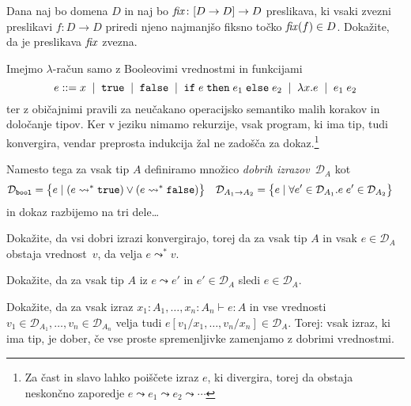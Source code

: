 \documentclass[arhiv]{izpit}
\begin{document}
\nadaljevanje

\naloga[\tocke{20}]
Dana naj bo domena $D$ in naj bo $\mathit{fix} \colon [D \to D] \to D$ preslikava, ki vsaki zvezni preslikavi $f \colon D \to D$ priredi njeno najmanjšo fiksno točko $\mathit{fix}(f) \in D$. Dokažite, da je preslikava $\mathit{fix}$ zvezna.

\nadaljevanje

\naloga[\tocke{20}]
\newcommand{\good}[1]{\mathcal{D}_{#1}}
Imejmo $\lambda$-račun samo z Booleovimi vrednostmi in funkcijami
\[
  e \mathrel{{:}{:}{=}}
  x \;\mid\;
  \mathtt{true} \;\mid\;
  \mathtt{false} \;\mid\;
  \mathtt{if}\;e\;\mathtt{then}\;e_1\;\mathtt{else}\;e_2 \;\mid\;
  \lambda x. e \;\mid\;
  e_1 \; e_2
\]
ter z običajnimi pravili za neučakano operacijsko semantiko malih korakov in določanje tipov. Ker v jeziku nimamo rekurzije, vsak program, ki ima tip, tudi konvergira, vendar preprosta indukcija žal ne zadošča za dokaz.\footnote{Za čast in slavo lahko poiščete izraz $e$, ki divergira, torej da obstaja neskončno zaporedje
$e \leadsto e_1 \leadsto e_2 \leadsto \cdots$
}


Namesto tega za vsak tip $A$ definiramo množico \emph{dobrih izrazov}~$\good{A}$ kot
%
\begin{align*}
  \good{\boolty} &=
    \big\{ e \mid (e \leadsto^* \tru) \lor (e \leadsto^* \fls) \big\} &
  \good{\funty{A_1}{A_2}} &=
    \big\{ e \mid \forall e' \in \good{A_1}. e \; e' \in \good{A_2} \big\}
\end{align*}
%
in dokaz razbijemo na tri dele\ldots

\podnaloga
Dokažite, da vsi dobri izrazi konvergirajo, torej da za vsak tip $A$ in vsak $e \in \good{A}$ obstaja vrednost~$v$, da velja $e \leadsto^* v$.

\podnaloga
Dokažite, da za vsak tip $A$ iz $e \leadsto e'$ in $e' \in \good{A}$ sledi $e \in \good{A}$.

\podnaloga
Dokažite, da za vsak izraz $x_1 : A_1, \dots, x_n : A_n \vdash e : A$ in vse vrednosti $v_1 \in \good{A_1}, \dots, v_n \in \good{A_n}$ velja tudi $e[v_1 / x_1, \dots, v_n / x_n] \in \good{A}$. Torej: vsak izraz, ki ima tip, je dober, če vse proste spremenljivke zamenjamo z dobrimi vrednostmi.

\nadaljevanje
\end{document}
